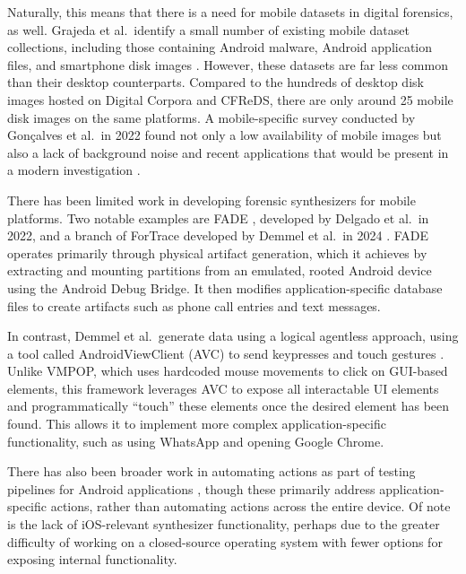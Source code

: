 Naturally, this means that there is a need for mobile datasets in
digital forensics, as well. Grajeda et al.~identify a small number of
existing mobile dataset collections, including those containing Android
malware, Android application files, and smartphone disk images
\cite{grajedaAvailabilityDatasetsDigital2017}. However, these
datasets are far less common than their desktop counterparts. Compared
to the hundreds of desktop disk images hosted on Digital Corpora and
CFReDS, there are only around 25 mobile disk images on the same
platforms. A mobile-specific survey conducted by Gonçalves et al.~in
2022 found not only a low availability of mobile images but also a lack
of background noise and recent applications that would be present in a
modern investigation \cite{goncalvesRevisitingDatasetGap2022}.

There has been limited work in developing forensic synthesizers for
mobile platforms. Two notable examples are FADE
\cite{ceballosdelgadoFADEForensicImage2022}, developed by Delgado et
al.~in 2022, and a branch of ForTrace developed by Demmel et al.~in 2024
\cite{demmelDataSynthesisGoing2024}. FADE operates primarily through
physical artifact generation, which it achieves by extracting and
mounting partitions from an emulated, rooted Android device using the
Android Debug Bridge. It then modifies application-specific database
files to create artifacts such as phone call entries and text messages.

In contrast, Demmel et al.~generate data using a logical agentless
approach, using a tool called AndroidViewClient (AVC) to send keypresses
and touch gestures \cite{demmelDataSynthesisGoing2024}. Unlike
VMPOP, which uses hardcoded mouse movements to click on GUI-based
elements, this framework leverages AVC to expose all interactable UI
elements and programmatically ``touch'' these elements once the desired
element has been found. This allows it to implement more complex
application-specific functionality, such as using WhatsApp and opening
Google Chrome.

There has also been broader work in automating actions as part of
testing pipelines for Android applications
\cite{janickiObstaclesOpportunitiesDeploying2012,nagowahNovelApproachAutomation2012,linares-vasquezHowDevelopersTest2017},
though these primarily address application-specific actions, rather than
automating actions across the entire device. Of note is the lack of
iOS-relevant synthesizer functionality, perhaps due to the greater
difficulty of working on a closed-source operating system with fewer
options for exposing internal functionality.

